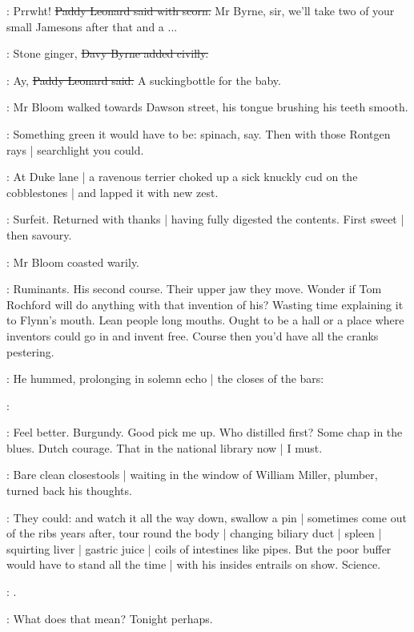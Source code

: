 \leonard:
Prrwht!
\sout{Paddy Leonard said with scorn.}
Mr Byrne, sir,
we'll take two of your small Jamesons after that and a ...

\davybyrne:
Stone ginger,
\sout{Davy Byrne added civilly.}

\leonard:
Ay,
\sout{Paddy Leonard said.}
A suckingbottle for the baby.

:
Mr Bloom walked towards Dawson street,
his tongue brushing his teeth smooth.

\BloomInt:
Something green it would have to be:
spinach, say.
Then with those Rontgen rays |
searchlight you could.

:
At Duke lane |
a ravenous terrier choked up a sick knuckly cud on the cobblestones |
and lapped it with new zest.

\BloomInt:
Surfeit.
Returned with thanks |
having fully digested the contents.
First sweet |
then savoury.

:
Mr Bloom coasted warily.

\BloomInt:
Ruminants.
His second course.
Their upper jaw they move.
Wonder if Tom Rochford will do anything with that invention of his?
Wasting time explaining it to Flynn's mouth.
Lean people long mouths.
Ought to be a hall or a place where inventors could go in and invent free.
Course then you'd have all the cranks pestering.

:
He hummed,
prolonging in solemn echo |
the closes of the bars:

\Bloom:


\BloomInt:
Feel better.
Burgundy.
Good pick me up.
Who distilled first?
Some chap in the blues.
Dutch courage.
That  in the national library now |
I must.

:
Bare clean closestools |
waiting in the window of William Miller, plumber,
turned back his thoughts.

\BloomInt:
They could:
and watch it all the way down,
swallow a pin |
sometimes come out of the ribs years after,
tour round the body |
changing biliary duct |
spleen |
squirting liver |
gastric juice |
coils of intestines like pipes.
But the poor buffer
would have to stand all the time |
with his insides entrails on show.
Science.

\Bloom:
.

\BloomInt:
What does that  mean?
Tonight perhaps.

